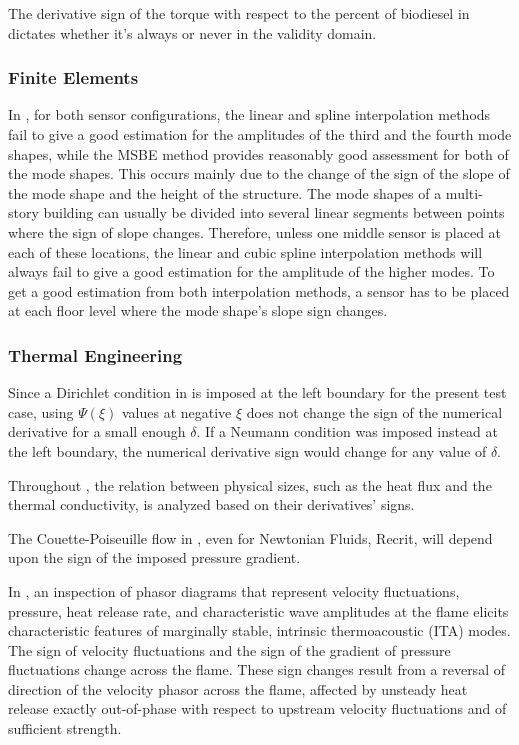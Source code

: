 \documentclass[11pt]{book}
\begin{document}
The derivative sign of the torque with respect to the percent of biodiesel
in \cite{bietresato2019use} dictates whether it's always or never
in the validity domain.


\subsubsection{Finite Elements}

In \cite{kaya2015system}, for both sensor configurations, the linear
and spline interpolation methods fail to give a good estimation for
the amplitudes of the third and the fourth mode shapes, while the
MSBE method provides reasonably good assessment for both of the mode
shapes. This occurs mainly due to the change of the sign of the slope
of the mode shape and the height of the structure. The mode shapes
of a multi-story building can usually be divided into several linear
segments between points where the sign of slope changes. Therefore,
unless one middle sensor is placed at each of these locations, the
linear and cubic spline interpolation methods will always fail to
give a good estimation for the amplitude of the higher modes. To get
a good estimation from both interpolation methods, a sensor has to
be placed at each floor level where the mode shape's slope sign changes.


\subsubsection{Thermal Engineering}

Since a Dirichlet condition in \cite{chalhub2013integral} is imposed
at the left boundary for the present test case, using $\Psi\left(\xi\right)$
values at negative $\xi$ does not change the sign of the numerical
derivative for a small enough $\delta$. If a Neumann condition was
imposed instead at the left boundary, the numerical derivative sign
would change for any value of $\delta$.

Throughout \cite{zarubin2016critical}, the relation between physical
sizes, such as the heat flux and the thermal conductivity, is analyzed
based on their derivatives' signs.

The Couette-Poiseuille flow in \cite{coelho2020heat}, even for Newtonian
Fluids, Recrit, will depend upon the sign of the imposed pressure
gradient.

In \cite{yong2021categorization}, an inspection of phasor diagrams
that represent velocity fluctuations, pressure, heat release rate,
and characteristic wave amplitudes at the flame elicits characteristic
features of marginally stable, intrinsic thermoacoustic (ITA) modes.
The sign of velocity fluctuations and the sign of the gradient of
pressure fluctuations change across the flame. These sign changes
result from a reversal of direction of the velocity phasor across
the flame, affected by unsteady heat release exactly out-of-phase
with respect to upstream velocity fluctuations and of sufficient strength.
\end{document}
